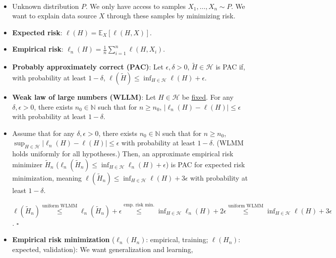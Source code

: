 \documentclass[8pt,a4paper]{extarticle}
\renewcommand{\proof}[1]{\begin{tcolorbox}#1 \hfill $\square$\end{tcolorbox}}
\newcommand{\E}{\mathbb{E}}
\newenvironment{topic}[1]
{\textbf{\sffamily \colorbox{black}{\rlap{\textbf{\textcolor{white}{#1}}}\hspace{\linewidth}\hspace{-2\fboxsep}}} \\ \vspace{0.2cm}}
{}
\begin{document}
\begin{multicols*}{2}
    \begin{topic}{Risk minimization}
        \begin{itemize}
            \item Unknown distribution $P$. We only have access to samples $X_1, \ldots, X_n \sim P$. We want to
                  explain data source $X$ through these samples by minimizing risk.
            \item \textbf{Expected risk}: $\ell(H) = \E_X[\ell(H, X)]$.
            \item \textbf{Empirical risk}: $\ell_n(H) = \frac{1}{n} \sum_{i=1}^{n} \ell(H, X_i)$.
            \item \textbf{Probably approximately correct (PAC)}: Let $\epsilon, \delta > 0$,
                  $\tilde{H} \in \mathcal{H}$ is PAC if, with probability at least $1-\delta$,
                  $\ell(\tilde{H}) \leq \inf_{H \in \mathcal{H}} \ell(H) + \epsilon$.
            \item \textbf{Weak law of large numbers (WLLM)}: Let $H \in \mathcal{H}$ be
                  \underline{fixed}. For any $\delta,\epsilon > 0$, there exists $n_0 \in \mathbb{N}$
                  such that for $n \geq n_0$, $|\ell_n(H) - \ell(H)| \leq \epsilon$ with probability
                  at least $1-\delta$.
            \item Assume that for any $\delta, \epsilon > 0$, there exists $n_0 \in \mathbb{N}$ such that for $n \geq
                      n_0$, $\sup_{H\in \mathcal{H}} |\ell_n(H) - \ell(H)| \leq \epsilon$ with probability at least
                  $1-\delta$. (WLMM holds uniformly for all hypotheses.) Then, an approximate empirical risk
                  minimizer $\tilde{H}_n$ ($\ell_n(\tilde{H}_n) \leq \inf_{H \in \mathcal{H}} \ell_n(H) + \epsilon$)
                  is PAC for expected risk minimization, meaning $\ell(\tilde{H}_n) \leq \inf_{H \in \mathcal{H}}
                      \ell(H) + 3 \epsilon$ with probability at least $1-\delta$. \proof{$\ell(\tilde{H}_n)
                          \overset{\text{uniform WLMM}}{\leq} \ell_n(\tilde{H}_n) + \epsilon \overset{\text{emp. risk
                                  min.}}{\leq} \inf_{H \in \mathcal{H}} \ell_n(H) + 2 \epsilon \overset{\text{uniform WLMM}}{\leq}
                          \inf_{H \in \mathcal{H}} \ell(H) + 3 \epsilon$.}
            \item \textbf{Empirical risk minimization} ($\ell_n(H_n)$: empirical, training; $\ell(H_n)$: expected, validation): We want generalization and learning,
                  \begin{itemize}

\end{itemize}
\end{itemize}
\end{topic}
\end{multicols*}
\end{document}
